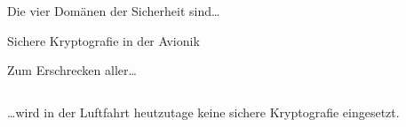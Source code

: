 
\begin{frame}{Die vier Domänen der Sicherheit sind…}
\end{frame}



\begin{frame}[c]{Sichere Kryptografie in der Avionik}
\end{frame}

\begin{frame}[c]{Zum Erschrecken aller…}
  \begin{columns}[fullwidth,c]
    \begin{column}{.4\linewidth}

        \footnotesize
        …wird in der Luftfahrt heutzutage keine sichere Kryptografie eingesetzt. 
    \end{column}%
    \hfill
  \end{columns}
\end{frame}


